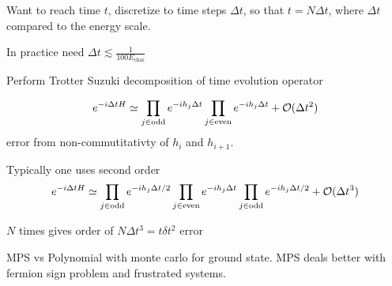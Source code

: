 \documentclass[a4paper]{article}
\begin{document}
Want to reach time $t$, discretize to time steps $\Delta t$, so that $t=N\Delta
t$, where $\Delta t$ compared to the energy scale. 
\begin{remark}
    In practice need $\Delta t \lesssim \frac{1}{100 E_\mathrm{char}}$
\end{remark}
Perform Trotter Suzuki decomposition of time evolution operator 

\[
    e^{-i\Delta t H} \simeq \prod_{j\in \text{odd}} e^{-ih_j\Delta t}\prod_{j\in
    \text{even}} e^{-i h_j\Delta t} + \mathcal{O}(\Delta t^2)
\]
error from non-commutitativty of $h_i$ and $h_{i+1}$.
\begin{remark}
    Typically one uses second order 
\[
    e^{-i\Delta t H} \simeq \prod_{j\in \text{odd}} e^{-ih_j\Delta t/2}\prod_{j\in
    \text{even}} e^{-i h_j\Delta t} \prod_{j\in \text{odd}} e^{-ih_j\Delta t/2}
    +\mathcal{O}(\Delta t^3)
\]
\end{remark}
$N$ times gives order of $N\Delta t^3=t \delta t^2$ error

\begin{remark}
    MPS vs Polynomial with monte carlo for ground state. MPS deals better with
    fermion sign problem and frustrated systems.
\end{remark}
\end{document}
